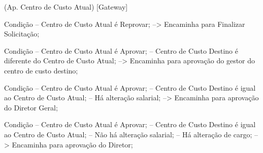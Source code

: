          (Ap. Centro de Custo Atual)
            [Gateway]

               Condição
                  -- Centro de Custo Atual é Reprovar;
                     --> Encaminha para Finalizar Solicitação;

               Condição
                  -- Centro de Custo Atual é Aprovar;
                  -- Centro de Custo Destino é diferente do Centro de Custo Atual;
                     --> Encaminha para aprovação do gestor do centro de custo destino;

               Condição
                  -- Centro de Custo Atual é Aprovar;
                  -- Centro de Custo Destino é igual ao Centro de Custo Atual;
                  -- Há alteração salarial;
                     --> Encaminha para aprovação do Diretor Geral;

               Condição
                  -- Centro de Custo Atual é Aprovar;
                  -- Centro de Custo Destino é igual ao Centro de Custo Atual;
                  -- Não há alteração salarial;
                  -- Há alteração de cargo;
                     --> Encaminha para aprovação do Diretor;
